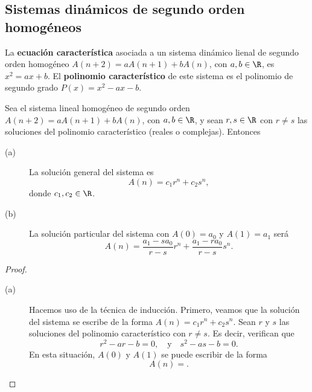 \subsection{Sistemas dinámicos de segundo orden homogéneos}
\begin{fdefinition}
\normalfont La \textbf{ecuación característica} asociada a un sistema dinámico lienal de segundo orden homogéneo $\displaystyle A\left(n+2\right) = aA\left(n+1\right) + bA\left(n\right) $, con $\displaystyle a, b \in \R $, es $\displaystyle x^{2} = ax + b $. El \textbf{polinomio característico} de este sistema es el polinomio de segundo grado $\displaystyle P\left(x\right) = x^{2}-ax - b $.
\end{fdefinition}
\begin{ftheorem}[]
\normalfont Sea el sistema lineal homogéneo de segundo orden $\displaystyle A\left(n+2\right) = aA\left(n+1\right) + bA\left(n\right) $, con $\displaystyle a,b \in \R $, y sean $\displaystyle r,s \in \R $ con $\displaystyle r \neq s $ las soluciones del polinomio característico (reales o complejas). Entonces
\begin{description}
\item[(a)] La solución general del sistema es
	\[A\left(n\right) = c_{1}r^{n} + c_{2}s^{n} ,\]
	donde $\displaystyle c_{1}, c_{2} \in \R $.
\item[(b)] La solución particular del sistema con $\displaystyle A\left(0\right) = a_{0} $ y $\displaystyle A\left(1\right) = a_{1} $ será
	\[ A\left(n\right) = \frac{a_{1}-sa_{0}}{r-s}r^{n} + \frac{a_{1}-ra_{0}}{r-s}s^{n} .\]
\end{description}
\end{ftheorem}
\begin{proof}
\begin{description}
\item[(a)] Hacemos uso de la técnica de inducción. Primero, veamos que la solución del sistema se escribe de la forma $\displaystyle A\left(n\right) = c_{1}r^{n} + c_{2}s^{n} $. Sean $\displaystyle r $ y $\displaystyle s $ las soluciones del polinomio característico con $\displaystyle r \neq s $. Es decir, verifican que
	\[ r^{2}-ar - b = 0, \quad \text{y} \quad s^{2}-as-b = 0.\]
En esta situación, $\displaystyle A\left(0\right) $ y $\displaystyle A\left(1\right) $ se puede escribir de la forma
\[A\left(n\right) =  .\]
\end{description}
\end{proof}

